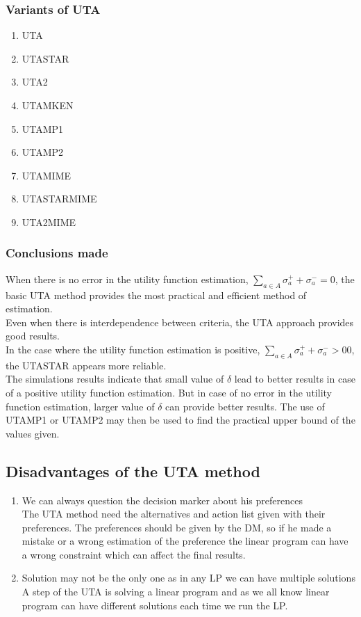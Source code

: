 \documentclass{report}
\begin{document}
\subsubsection{Variants of UTA}
\begin{enumerate}
\item UTA
\item UTASTAR
\item UTA2
\item UTAMKEN
\item UTAMP1
\item UTAMP2
\item UTAMIME
\item UTASTARMIME
\item UTA2MIME
\end{enumerate}

\subsubsection{Conclusions made}
When there is no error in the utility function estimation, $ \sum_{a \in A} \sigma _{a}^{+} + \sigma _{a}^{-} = 0$, the basic UTA method provides the most practical and efficient method of estimation. \\
Even when there is interdependence between criteria, the UTA approach provides good results. \\
In the case where the utility function estimation is positive, $ \sum_{a \in A} \sigma _{a}^{+} + \sigma _{a}^{-} >0 0$, the UTASTAR appears more reliable.\\
The simulations results indicate that small value of $\delta$ lead to better results in case of a positive utility function estimation. But in case of no error in the utility function estimation, larger value of $\delta$ can provide better results. The use of UTAMP1 or UTAMP2 may then be used to find the practical upper bound of the values given. 

\subsection{Disadvantages of the UTA method}
\begin{enumerate}
\item We can always question the decision marker about his preferences\\
The UTA method need the alternatives and action list given with their preferences. The preferences should be given by the DM, so if he made a mistake or a wrong estimation of the preference the linear program can have a wrong constraint which can affect the final results. 
\item Solution may not be the only one as in any LP we can have multiple solutions\\
A step of the UTA is solving a linear program and as we all know linear program can have different solutions each time we run the LP.
\end{enumerate}
\end{document}
